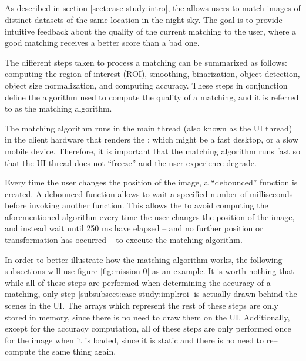 \subsection{\mlblinkui} \label{subsect:case-study:impl:ml-blink-ui}

As described in section \ref{sect:case-study:intro}, the \mlblinkui allows users to match images of distinct datasets of the same location in the night sky. The goal is to provide intuitive feedback about the quality of the current matching to the user, where a good matching receives a better score than a bad one. \newline

The different steps taken to process a matching can be summarized as follows: computing the region of interest (ROI), smoothing, binarization, object detection, object size normalization, and computing accuracy. These steps in conjunction define the algorithm used to compute the quality of a matching, and it is referred to as the matching algorithm. \newline

The matching algorithm runs in the main thread (also known as the UI thread) in the client hardware that renders the \mlblinkui; which might be a fast desktop, or a slow mobile device. Therefore, it is important that the matching algorithm runs fast so that the UI thread does not ``freeze'' and the user experience degrade. \newline

Every time the user changes the position of the \panstarrs image, a ``debounced'' function is created. A debounced function allows to wait a specified number of milliseconds before invoking another function. This allows the \mlblinkui to avoid computing the aforementioned algorithm every time the user changes the position of the \panstarrs image, and instead wait until 250 \si{\milli\second} have elapsed -- and no further position or transformation has occurred -- to execute the matching algorithm. \newline

In order to better illustrate how the matching algorithm works, the following subsections will use figure \ref{fig:mission-0} as an example. It is worth nothing that while all of these steps are performed when determining the accuracy of a matching, only step \ref{subsubsect:case-study:impl:roi} is actually drawn behind the scenes in the UI. The arrays which represent the rest of these steps are only stored in memory, since there is no need to draw them on the UI. Additionally, except for the accuracy computation, all of these steps are only performed once for the \usno image when it is loaded, since it is static and there is no need to re--compute the same thing again.

